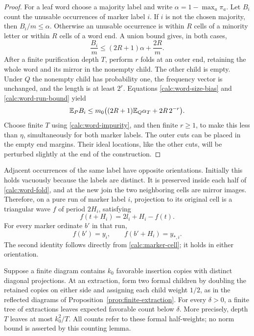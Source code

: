 \begin{proof}
For a leaf word choose a majority label and write
$\alpha=1-\max_a\pi_a$. Let $B_i$ count the unusable occurrences
of marker label $i$. If $i$ is not the chosen majority, then
$B_i/m\le\alpha$. Otherwise an unusable occurrence is within $R$
cells of a minority letter or within $R$ cells of a word end. A
union bound gives, in both cases,
\begin{equation}
 \frac{B_i}{m}\le(2R+1)\alpha+\frac{2R}{m}.
 \label{calc:word-run-bound}
\end{equation}
After a finite purification depth $T$, perform $r$ folds at an
outer end, retaining the whole word and its mirror in the nonempty
child. The other child is empty. Under $Q$ the nonempty child has
probability one, the frequency vector is unchanged, and the length
is at least $2^r$. Equations \eqref{calc:word-size-bias} and
\eqref{calc:word-run-bound} yield
\[
 \mathbb E_P B_i\le m_0\bigl((2R+1)\mathbb E_Q\alpha_T+2R\,2^{-r}\bigr).
\]
Choose finite $T$ using \eqref{calc:word-impurity}, and then finite
$r\ge1$, to make this less than $\eta$, simultaneously for both
marker labels. The outer cuts can be placed in the empty end
margins. Their ideal locations, like the other cuts, will be
perturbed slightly at the end of the construction.
\end{proof}

Adjacent occurrences of the same label have opposite orientations.
Initially this holds vacuously because the labels are distinct.
It is preserved inside each half of \eqref{calc:word-fold}, and at
the new join the two neighboring cells are mirror images. Therefore,
on a pure run of marker label $i$, projection to its original cell
is a triangular wave $f$ of period $2H_i$, satisfying
\begin{equation}
 f(t+H_i)=2l_i+H_i-f(t).
 \label{calc:triangular-wave}
\end{equation}
For every marker ordinate $b'$ in that run,
\begin{equation}
 f(b')=y_i,
 \qquad f(b'+H_i)=y_{*,i}.
 \label{calc:marker-anchor}
\end{equation}
The second identity follows directly from
\eqref{calc:marker-cell}; it holds in either orientation.

\begin{lemma}
\label{lem:calc-median-extraction}
Suppose a finite diagram contains $k_0$ favorable insertion copies
with distinct diagonal projections.  At an extraction, form two
formal children by doubling the retained copies on either side and
assigning each child weight $1/2$, as in the reflected diagrams of
Proposition~\ref{prop:finite-extraction}. For every $\delta>0$, a
finite tree of extractions leaves expected favorable count below
$\delta$. More precisely, depth $T$ leaves at most $k_0^2/T$.
All counts refer to these formal half-weights; no norm bound is
asserted by this counting lemma.
\end{lemma}

